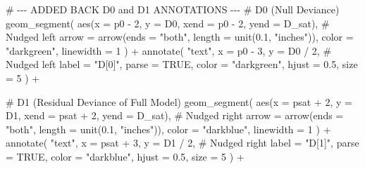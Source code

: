 \documentclass[
  letterpaper,
]{scrbook}
\newenvironment{Shaded}{\begin{snugshade}}{\end{snugshade}}
\newcommand{\AttributeTok}[1]{\textcolor[rgb]{0.40,0.45,0.13}{#1}}
\newcommand{\CommentTok}[1]{\textcolor[rgb]{0.37,0.37,0.37}{#1}}
\newcommand{\ConstantTok}[1]{\textcolor[rgb]{0.56,0.35,0.01}{#1}}
\newcommand{\DecValTok}[1]{\textcolor[rgb]{0.68,0.00,0.00}{#1}}
\newcommand{\FloatTok}[1]{\textcolor[rgb]{0.68,0.00,0.00}{#1}}
\newcommand{\FunctionTok}[1]{\textcolor[rgb]{0.28,0.35,0.67}{#1}}
\newcommand{\NormalTok}[1]{\textcolor[rgb]{0.00,0.23,0.31}{#1}}
\newcommand{\SpecialCharTok}[1]{\textcolor[rgb]{0.37,0.37,0.37}{#1}}
\newcommand{\StringTok}[1]{\textcolor[rgb]{0.13,0.47,0.30}{#1}}
\begin{document}
\begin{Shaded}
\begin{Highlighting}[]
  \CommentTok{\# {-}{-}{-} ADDED BACK D0 and D1 ANNOTATIONS {-}{-}{-}}
  \CommentTok{\# D0 (Null Deviance)}
  \FunctionTok{geom\_segment}\NormalTok{(}
    \FunctionTok{aes}\NormalTok{(}\AttributeTok{x =}\NormalTok{ p0 }\SpecialCharTok{{-}} \DecValTok{2}\NormalTok{, }\AttributeTok{y =}\NormalTok{ D0, }\AttributeTok{xend =}\NormalTok{ p0 }\SpecialCharTok{{-}} \DecValTok{2}\NormalTok{, }\AttributeTok{yend =}\NormalTok{ D\_sat), }\CommentTok{\# Nudged left}
    \AttributeTok{arrow =} \FunctionTok{arrow}\NormalTok{(}\AttributeTok{ends =} \StringTok{"both"}\NormalTok{, }\AttributeTok{length =} \FunctionTok{unit}\NormalTok{(}\FloatTok{0.1}\NormalTok{, }\StringTok{"inches"}\NormalTok{)),}
    \AttributeTok{color =} \StringTok{"darkgreen"}\NormalTok{,}
    \AttributeTok{linewidth =} \DecValTok{1}
\NormalTok{  ) }\SpecialCharTok{+}
  \FunctionTok{annotate}\NormalTok{(}
    \StringTok{"text"}\NormalTok{,}
    \AttributeTok{x =}\NormalTok{ p0 }\SpecialCharTok{{-}} \DecValTok{3}\NormalTok{, }\AttributeTok{y =}\NormalTok{ D0 }\SpecialCharTok{/} \DecValTok{2}\NormalTok{, }\CommentTok{\# Nudged left}
    \AttributeTok{label =} \StringTok{"D[0]"}\NormalTok{, }\AttributeTok{parse =} \ConstantTok{TRUE}\NormalTok{,}
    \AttributeTok{color =} \StringTok{"darkgreen"}\NormalTok{, }\AttributeTok{hjust =} \FloatTok{0.5}\NormalTok{, }\AttributeTok{size =} \DecValTok{5}
\NormalTok{  ) }\SpecialCharTok{+}
  
  \CommentTok{\# D1 (Residual Deviance of Full Model)}
  \FunctionTok{geom\_segment}\NormalTok{(}
    \FunctionTok{aes}\NormalTok{(}\AttributeTok{x =}\NormalTok{ psat }\SpecialCharTok{+} \DecValTok{2}\NormalTok{, }\AttributeTok{y =}\NormalTok{ D1, }\AttributeTok{xend =}\NormalTok{ psat }\SpecialCharTok{+} \DecValTok{2}\NormalTok{, }\AttributeTok{yend =}\NormalTok{ D\_sat), }\CommentTok{\# Nudged right}
    \AttributeTok{arrow =} \FunctionTok{arrow}\NormalTok{(}\AttributeTok{ends =} \StringTok{"both"}\NormalTok{, }\AttributeTok{length =} \FunctionTok{unit}\NormalTok{(}\FloatTok{0.1}\NormalTok{, }\StringTok{"inches"}\NormalTok{)),}
    \AttributeTok{color =} \StringTok{"darkblue"}\NormalTok{,}
    \AttributeTok{linewidth =} \DecValTok{1}
\NormalTok{  ) }\SpecialCharTok{+}
  \FunctionTok{annotate}\NormalTok{(}
    \StringTok{"text"}\NormalTok{,}
    \AttributeTok{x =}\NormalTok{ psat }\SpecialCharTok{+} \DecValTok{3}\NormalTok{, }\AttributeTok{y =}\NormalTok{ D1 }\SpecialCharTok{/} \DecValTok{2}\NormalTok{, }\CommentTok{\# Nudged right}
    \AttributeTok{label =} \StringTok{"D[1]"}\NormalTok{, }\AttributeTok{parse =} \ConstantTok{TRUE}\NormalTok{,}
    \AttributeTok{color =} \StringTok{"darkblue"}\NormalTok{, }\AttributeTok{hjust =} \FloatTok{0.5}\NormalTok{, }\AttributeTok{size =} \DecValTok{5}
\NormalTok{  ) }\SpecialCharTok{+}
  

\end{Highlighting}
\end{Shaded}
\end{document}
